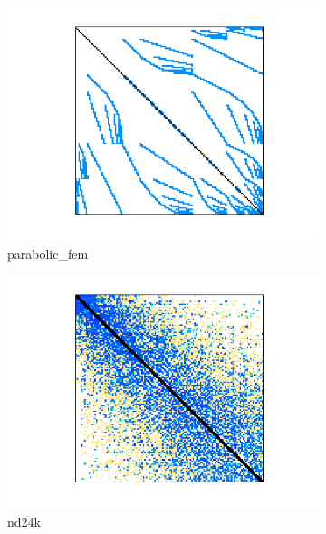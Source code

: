 \begin{figure}[H]
\begin{subfigure}[b]{0.3\textwidth}
        \includegraphics[width=\textwidth]{./images/CG/parabolic_fem.png}
        \caption{parabolic\_fem}
    \end{subfigure}
    \quad 
    \begin{subfigure}[b]{0.3\textwidth}
        \includegraphics[width=\textwidth]{./images/CG/nd24k.png}
        \caption{nd24k}
    \end{subfigure}
    \quad 
    \begin{subfigure}[b]{0.3\textwidth}

\end{subfigure}
\end{figure}
